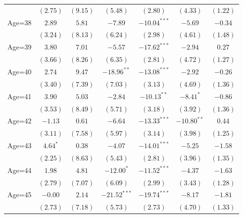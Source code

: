 \documentclass[fullpage]{paper}
\begin{document}
\begin{center}
\begin{longtable}{l c c c c c c }
            & $(2.75)$      & $(9.15)$      & $(5.48)$       & $(2.80)$       & $(4.33)$       & $(1.22)$      \\
Age=38      & $2.89$        & $5.81$        & $-7.89$        & $-10.04^{***}$ & $-5.69$        & $-0.34$       \\
            & $(3.24)$      & $(8.13)$      & $(6.24)$       & $(2.98)$       & $(4.61)$       & $(1.48)$      \\
Age=39      & $3.80$        & $7.01$        & $-5.57$        & $-17.62^{***}$ & $-2.94$        & $0.27$        \\
            & $(3.66)$      & $(8.26)$      & $(6.35)$       & $(2.81)$       & $(4.72)$       & $(1.27)$      \\
Age=40      & $2.74$        & $9.47$        & $-18.96^{**}$  & $-13.08^{***}$ & $-2.92$        & $-0.26$       \\
            & $(3.40)$      & $(7.39)$      & $(7.03)$       & $(3.13)$       & $(4.69)$       & $(1.36)$      \\
Age=41      & $3.90$        & $5.03$        & $-2.84$        & $-10.13^{**}$  & $-8.41^{*}$    & $-0.86$       \\
            & $(3.53)$      & $(8.49)$      & $(5.71)$       & $(3.18)$       & $(3.92)$       & $(1.36)$      \\
Age=42      & $-1.13$       & $0.61$        & $-6.64$        & $-13.33^{***}$ & $-10.80^{**}$  & $0.44$        \\
            & $(3.11)$      & $(7.58)$      & $(5.97)$       & $(3.14)$       & $(3.98)$       & $(1.25)$      \\
Age=43      & $4.64^{*}$    & $0.38$        & $-4.07$        & $-14.01^{***}$ & $-5.25$        & $-1.58$       \\
            & $(2.25)$      & $(8.63)$      & $(5.43)$       & $(2.81)$       & $(3.96)$       & $(1.35)$      \\
Age=44      & $1.98$        & $4.81$        & $-12.00^{*}$   & $-11.52^{***}$ & $-4.37$        & $-1.63$       \\
            & $(2.79)$      & $(7.07)$      & $(6.09)$       & $(2.99)$       & $(3.43)$       & $(1.28)$      \\
Age=45      & $-0.00$       & $2.14$        & $-21.52^{***}$ & $-19.74^{***}$ & $-8.17$        & $-1.81$       \\
            & $(2.73)$      & $(7.18)$      & $(5.73)$       & $(2.73)$       & $(4.70)$       & $(1.33)$      \\

\end{longtable}
\end{center}
\end{document}
